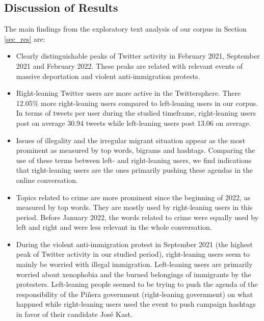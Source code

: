     \subsection{Discussion of Results}
        The main findings from the exploratory text analysis of our corpus in Section \ref{sec_res} are:
        
        \begin{itemize}
            \item 
            Clearly distinguishable peaks of Twitter activity in February 2021, September 2021 and February 2022. These peaks are related with relevant events of massive deportation and violent anti-immigration protests.
            
            \item 
            Right-leaning Twitter users are more active in the Twittersphere. There 12.05\% more right-leaning users compared to left-leaning users in our corpus. In terms of tweets per user during the studied timeframe, right-leaning users post on average 30.94 tweets while left-leaning users post 13.06 on average.
            
            \item 
            Issues of illegality and the irregular migrant situation appear as the most prominent as measured by top words, bigrams and hashtags. Comparing the use of these terms between left- and right-leaning users, we find indications that right-leaning users are the ones primarily pushing these agendas in the online conversation.
            
            \item 
            Topics related to crime are more prominent since the beginning of 2022, as measured by top words. They are mostly used by right-leaning users in this period. Before January 2022, the words related to crime were equally used by left and right and were less relevant in the whole conversation.
            
            \item 
            During the violent anti-immigration protest in September 2021 (the highest peak of Twitter activity in our studied period), right-leaning users seem to mainly be worried with illegal immigration. Left-leaning users are primarily worried about xenophobia and the burned belongings of immigrants by the protesters. Left-leaning people seemed to be trying to push the agenda of the responsibility of the Piñera government (right-leaning government) on what happned while right-leaning users used the event to push campaign hashtags in favor of their candidate José Kast.
            

\end{itemize}
